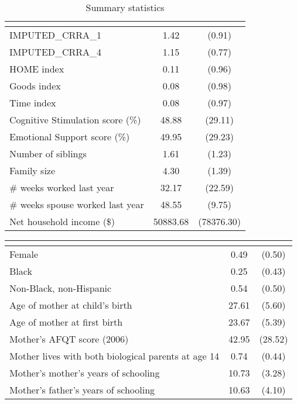 \begin{table}[htbp]\centering \caption{Summary statistics \label{table:5-summary}} \begin{tabular}{l*{1}{cc}} \toprule
                    &\multicolumn{2}{c}{}     \\
\midrule
IMPUTED\_CRRA\_1      &        1.42&      (0.91)\\
IMPUTED\_CRRA\_4      &        1.15&      (0.77)\\
HOME index          &        0.11&      (0.96)\\
Goods index         &        0.08&      (0.98)\\
Time index          &        0.08&      (0.97)\\
Cognitive Stimulation score (\%)&       48.88&     (29.11)\\
Emotional Support score (\%)&       49.95&     (29.23)\\
Number of siblings  &        1.61&      (1.23)\\
Family size         &        4.30&      (1.39)\\
$\#$ weeks worked last year&       32.17&     (22.59)\\
$\#$ weeks spouse worked last year&       48.55&      (9.75)\\
Net household income (\$)&    50883.68&  (78376.30)\\
\bottomrule
\end{tabular}
\end{table}
\begin{tabular}{l*{1}{cc}} \hline\hline
                    &\multicolumn{2}{c}{}     \\
\hline
Female              &        0.49&      (0.50)\\
Black               &        0.25&      (0.43)\\
Non-Black, non-Hispanic&        0.54&      (0.50)\\
Age of mother at child's birth&       27.61&      (5.60)\\
Age of mother at first birth&       23.67&      (5.39)\\
Mother's AFQT score (2006)&       42.95&     (28.52)\\
Mother lives with both biological parents at age 14&        0.74&      (0.44)\\
Mother's mother's years of schooling&       10.73&      (3.28)\\
Mother's father's years of schooling&       10.63&      (4.10)\\
\hline\hline
\end{tabular}
